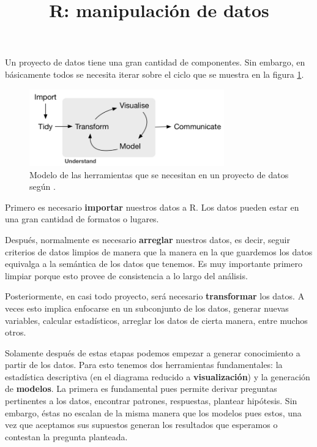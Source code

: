 \documentclass[]{article}
\title{R: manipulación de datos}
\author{}
\date{}
\begin{document}
\maketitle


Un proyecto de datos tiene una gran cantidad de componentes. Sin
embargo, en básicamente todos se necesita iterar sobre el ciclo que se
muestra en la figura \ref{fig:ciclo}.

\begin{figure}[h]
    \centering
    \includegraphics[width=0.75\textwidth]{../img/02_ciclo.png}
    \caption{Modelo de las herramientas que se necesitan en un proyecto de datos según \textcite[Introducción]{grolemund2016r}.}
    \label{fig:ciclo}
\end{figure}

Primero es necesario \textbf{importar} nuestros datos a R. Los datos
pueden estar en una gran cantidad de formatos o lugares.

Después, normalmente es necesario \textbf{arreglar} nuestros datos, es
decir, seguir criterios de datos limpios de manera que la manera en la
que guardemos los datos equivalga a la semántica de los datos que
tenemos. Es muy importante primero limpiar porque esto provee de
consistencia a lo largo del análisis.

Posteriormente, en casi todo proyecto, será necesario
\textbf{transformar} los datos. A veces esto implica enfocarse en un
subconjunto de los datos, generar nuevas variables, calcular
estadísticos, arreglar los datos de cierta manera, entre muchos otros.

Solamente después de estas etapas podemos empezar a generar conocimiento
a partir de los datos. Para esto tenemos dos herramientas fundamentales:
la estadística descriptiva (en el diagrama reducido a
\textbf{visualización}) y la generación de \textbf{modelos}. La primera
es fundamental pues permite derivar preguntas pertinentes a los datos,
encontrar patrones, respuestas, plantear hipótesis. Sin embargo, éstas
no escalan de la misma manera que los modelos pues estos, una vez que
aceptamos sus supuestos generan los resultados que esperamos o contestan
la pregunta planteada.
\end{document}

